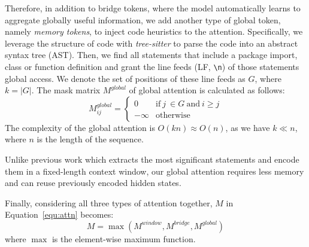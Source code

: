 \documentclass{article}
\begin{document}
Therefore, in addition to bridge tokens, where the model automatically learns to aggregate globally useful information, we add another type of global token, namely \textit{memory tokens}, to inject code heuristics to the attention. Specifically, we leverage the structure of code with \textit{tree-sitter} to parse the code into an abstract syntax tree (AST). Then, we find all statements that include a package import, class or function definition and grant the line feeds (LF, \verb$\n$) of those statements global access. We denote the set of positions of these line feeds as $G$, where $k=|G|$. The mask matrix $M^{global}$ of global attention is calculated as follows:
\begin{equation}
    M^\mathit{global}_{ij} = 
    \begin{cases}
        0 & \text{if}\ j\ \in G \ \text{and} \  i\geq j  \\
        -\infty & \text{otherwise}
    \end{cases}
\end{equation}
The complexity of the global attention is $O(kn) \approx O(n)$, as we have $k \ll n$, where $n$ is the length of the sequence. 




Unlike previous work \cite{clement2021long} which extracts the most significant statements and encode them in a fixed-length context window, our global attention requires less memory and can reuse previously encoded hidden states.

Finally, considering all three types of attention together, $M$ in Equation~\ref{equ:attn} becomes:
\begin{equation}
\label{equ:finalm}
    M = \max(M^\textit{window}, M^\textit{bridge}, M^\textit{global})
\end{equation}
where $\max$ is the element-wise maximum function.
\end{document}
